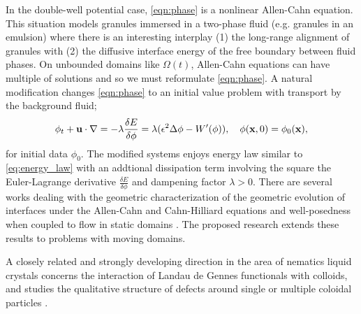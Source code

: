 In the double-well potential case, \eqref{eqn:phase}
is a nonlinear Allen-Cahn
equation.
This situation models granules immersed in a two-phase fluid
(e.g. granules in an emulsion) 
where there is an interesting interplay
(1) the long-range alignment of granules with (2) 
the diffusive interface energy of the free boundary
between fluid phases.
On unbounded domains like $\Omega(t)$,
Allen-Cahn equations can have multiple of solutions
\cite{Alama1997StationaryLS,Alikakos2008OnAE,Bronsard1993OnTB,
  Byeon2014SolutionsOH, Byeon2013OnAP, Alessio2005ENTIRESI,
  Trumper2007ExistenceOA,Benci2019MultipleSF}
and so we must reformulate
\eqref{eqn:phase}.
A natural modification changes
\eqref{eqn:phase} to an initial value problem with
transport by the background fluid;
\begin{equation}
  \label{eqn:phase_transport}
  \phi_t + \mathbf{u} \cdot \nabla
  = -\lambda \frac{\delta E}{\delta \phi}
  =  \lambda(\epsilon^2 \Delta \phi - W'(\phi)),
  \quad \phi(\mathbf{x},0) = \phi_0(\mathbf{x}),
\end{equation}
for initial data $\phi_0$.
The modified systems enjoys energy law similar to \eqref{eq:energy_law} 
with an addtional dissipation term involving the square 
the Euler-Lagrange derivative $\frac{\delta E}{\delta \phi}$ and dampening factor $\lambda > 0$.
There are several works dealing with the
geometric characterization of the geometric evolution
of interfaces under the Allen-Cahn and Cahn-Hilliard equations
\cite{Christlieb2019CompetitionAC, Gavish2011CurvatureDF, Dai2019WeakSF,
  Promislow2017ExistenceBA, Dai2015CompetitiveGE, Promislow2012CriticalPO,
  Dai2022GeometricEO, Dai2020MinimizersFT,Dai2013GeometricEO,Promislow2022UndulatedBI} and
well-posedness when coupled to flow in static domains
\cite{Jiang2017TwophaseIF, Liu2012StrongSF, Giorgini2019WellPosednessOA,
Wu2022WellposednessOA, Gal2010AsymptoticBO,
Giorgini2020DiffuseIM,Giorgini2019UniquenessAR}.
The proposed research extends these results to
problems with moving domains.

A closely related and strongly developing direction in
the area of nematics liquid crystals concerns the interaction of
Landau de Gennes functionals with colloids, and studies
the qualitative structure of defects around single or multiple
coloidal particles
\cite{doi:10.1098/rsta.2020.0432, Alama2015MinimizersOT, Alama2021SaturnRD, PhysRevE.96.042702}.

